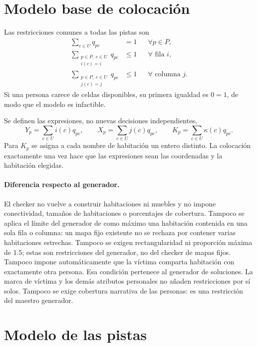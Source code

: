 \documentclass[11pt,a4paper]{article}
\begin{document}
\section{Modelo base de colocaci\'on}

Las restricciones comunes a todas las pistas son
\begin{align}
 \sum_{c\in U}q_{pc}&=1 &&\forall p\in P,\\
 \sum_{\substack{p\in P,\ c\in U\\i(c)=i}}q_{pc}&\leq 1
      &&\forall\text{ fila }i,\\
 \sum_{\substack{p\in P,\ c\in U\\j(c)=j}}q_{pc}&\leq 1
      &&\forall\text{ columna }j.
\end{align}
Si una persona carece de celdas disponibles, su primera igualdad
es $0=1$, de modo que el modelo es infactible.

Se definen las expresiones, no nuevas decisiones independientes,
\[
 Y_p=\sum_{c\in U}i(c)q_{pc},\qquad
 X_p=\sum_{c\in U}j(c)q_{pc},\qquad
 K_p=\sum_{c\in U}\kappa(c)q_{pc}.
\]
Para $K_p$ se asigna a cada nombre de habitaci\'on un entero distinto.
La colocaci\'on exactamente una vez hace que las expresiones sean
las coordenadas y la habitaci\'on elegidas.

\paragraph{Diferencia respecto al generador.}
El checker no vuelve a construir habitaciones ni muebles y no impone
conectividad, tama\~nos de habitaciones o porcentajes de cobertura.
Tampoco se aplica el l\'imite del generador de como m\'aximo una
habitaci\'on contenida en una sola fila o columna: un mapa fijo
existente no se rechaza por contener varias habitaciones estrechas.
Tampoco se exigen rectangularidad ni proporci\'on m\'axima de 1.5;
estas son restricciones del generador, no del checker de mapas fijos.
Tampoco impone autom\'aticamente que la v\'ictima comparta habitaci\'on
con exactamente otra persona. Esa condici\'on pertenece al generador
de soluciones. La marca de v\'ictima y los dem\'as atributos personales
no a\~naden restricciones por s\'i solos. Tampoco se exige cobertura
narrativa de las personas: es una restricci\'on del maestro generador.

\section{Modelo de las pistas}
\end{document}
